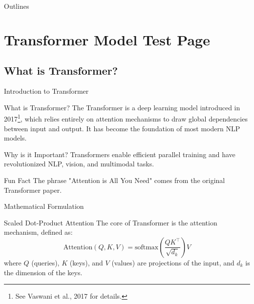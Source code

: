 \documentclass[10pt]{beamer}
\begin{document}
\begin{frame}[plain]
  \titlepage
\end{frame}

\begin{frame}[plain]{Outlines}
  \tableofcontents[hideallsubsections] %
\end{frame}

\section{Transformer Model Test Page}
\subsection{What is Transformer?}
\begin{frame}{Introduction to Transformer}
  \begin{block}{What is Transformer?}
    The Transformer is a deep learning model introduced in 2017\footnote{See Vaswani et al., 2017 for details.}, which relies entirely on attention mechanisms to draw global dependencies between input and output. It has become the foundation of most modern NLP models.
  \end{block}
  \begin{alertblock}{Why is it Important?}
    Transformers enable efficient parallel training and have revolutionized NLP, vision, and multimodal tasks.
  \end{alertblock}
  \begin{plainblock}{Fun Fact}
    The phrase "Attention is All You Need" comes from the original Transformer paper.
  \end{plainblock}
\end{frame}

\begin{frame}{Mathematical Formulation}
  \begin{block}{Scaled Dot-Product Attention}
    The core of Transformer is the attention mechanism, defined as:
    \[
      \text{Attention}(Q, K, V) = \text{softmax}\left(\frac{QK^\top}{\sqrt{d_k}}\right)V
    \]
    where $Q$ (queries), $K$ (keys), and $V$ (values) are projections of the input, and $d_k$ is the dimension of the keys.
  \end{block}
\end{frame}
\end{document}
